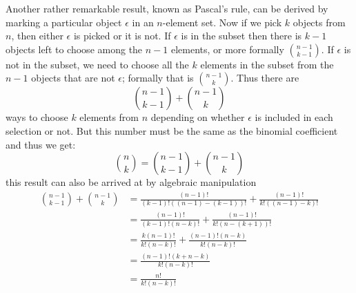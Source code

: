 \myindent Another rather remarkable result, known as Pascal's rule, can be derived by marking a particular object $\epsilon$ in an $n$-element set. Now if we pick $k$ objects from $n$, then either $\epsilon$ is picked or it is not. If $\epsilon$ is in the subset then there is $k-1$ objects left to choose among the $n-1$ elements, or more formally $\binom{n-1}{k-1}$. If $\epsilon$ is not in the subset, we need to choose all the $k$ elements in the subset from the $n-1$ objects that are not $\epsilon$; formally that is $\binom{n-1}{k}$. Thus there are
\[
\binom{n-1}{k-1} + \binom{n-1}{k}
\]
ways to choose $k$ elements from $n$ depending on whether $\epsilon$ is included in each selection or not. But this number must be the same as the binomial coefficient and thus we get:
\begin{equation}\label{pascal_rule}
\binom{n}{k}  = \binom{n-1}{k-1} + \binom{n-1}{k}
\end{equation}
this result can also be arrived at by algebraic manipulation
\begin{align*}
 \binom{n-1}{k-1} + \binom{n-1}{k}
& =  \frac{(n-1)!}{(k-1)!((n-1)-(k-1))!} + \frac{(n-1)!}{k!((n - 1) - k)!} \\
& =  \frac{(n-1)!}{(k-1)!(n-k)!} + \frac{(n-1)!}{k!(n - (k + 1))!} \\
& =  \frac{k(n-1)!}{k!(n-k)!} + \frac{(n-1)!(n-k)}{k!(n - k)!} \\
& =  \frac{(n-1)!(k + n - k)}{k!(n-k)!} \\
& =  \frac{n!}{k!(n-k)!}
\end{align*}

